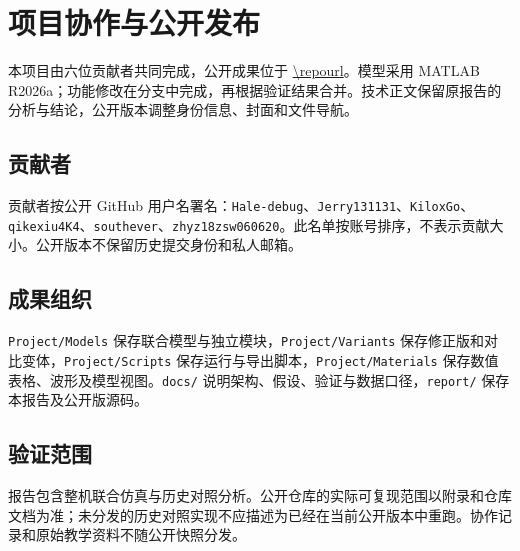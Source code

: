 \chapter{项目协作与公开发布}
\label{chap:workflow}
本项目由六位贡献者共同完成，公开成果位于 \url{\repourl}。模型采用 MATLAB R2026a；功能修改在分支中完成，再根据验证结果合并。技术正文保留原报告的分析与结论，公开版本调整身份信息、封面和文件导航。
\section{贡献者}
贡献者按公开 GitHub 用户名署名：\texttt{Hale-debug}、\texttt{Jerry131131}、\texttt{KiloxGo}、\texttt{qikexiu4K4}、\texttt{southever}、\texttt{zhyz18zsw060620}。此名单按账号排序，不表示贡献大小。公开版本不保留历史提交身份和私人邮箱。
\section{成果组织}
\texttt{Project/Models} 保存联合模型与独立模块，\texttt{Project/Variants} 保存修正版和对比变体，\texttt{Project/Scripts} 保存运行与导出脚本，\texttt{Project/Materials} 保存数值表格、波形及模型视图。\texttt{docs/} 说明架构、假设、验证与数据口径，\texttt{report/} 保存本报告及公开版源码。
\section{验证范围}
报告包含整机联合仿真与历史对照分析。公开仓库的实际可复现范围以附录和仓库文档为准；未分发的历史对照实现不应描述为已经在当前公开版本中重跑。协作记录和原始教学资料不随公开快照分发。
